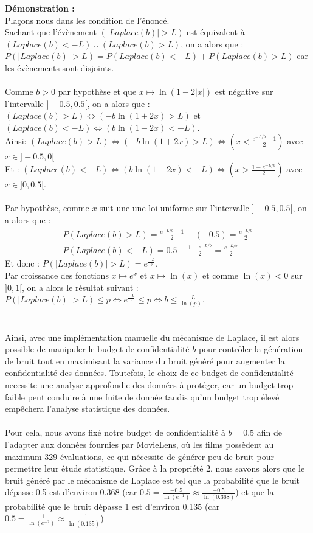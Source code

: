 \documentclass{article}
\begin{document}
\textbf{Démonstration :}\\
Plaçons nous dans les condition de l'énoncé.\\
Sachant que l'évènement $(|Laplace(b)| > L)$ est équivalent à $(Laplace(b)<-L) \cup (Laplace(b)>L)$, on a alors que :
\(P( |Laplace(b)| > L) = P(Laplace(b)<-L) + P(Laplace(b)>L) \) car les évènements sont disjoints.\\
\\
Comme $b>0$ par hypothèse et que $x\mapsto \ln(1 - 2|x|)$ est négative sur l'intervalle $]-0.5, 0.5[$, on a alors que :
\( (Laplace(b)>L) \Leftrightarrow (-b \ln(1+2x)>L)\) et \( (Laplace(b)<-L) \Leftrightarrow (b \ln(1-2x)<-L)\). \\
Ainsi: $ (Laplace(b)>L) \Leftrightarrow ( -b \ln(1+2x)>L) \Leftrightarrow (x < \frac{ e^{-L/b}-1}{2})$ avec $x\in]-0.5,0[$\\
Et : $ (Laplace(b)<-L) \Leftrightarrow ( b \ln(1-2x)<-L) \Leftrightarrow (x > \frac{ 1-e^{-L/b}}{2})$ avec $x\in]0,0.5[$.\\
\\
Par hypothèse, comme $x$ suit une une loi uniforme sur l'intervalle $]-0.5, 0.5[$, on a alors que :
\begin{align*}
    P(Laplace(b)>L) = \frac{ e^{-L/b}-1}{2} - (-0.5) = \frac{ e^{-L/b}}{2} \\
    P(Laplace(b)<-L) = 0.5 - \frac{ 1-e^{-L/b}}{2} = \frac{ e^{-L/b}}{2}
\end{align*}
Et donc : $P( |Laplace(b)| > L) = e^{\frac{-L}{b}}$.\\
Par croissance des fonctions $x\mapsto e^x$ et $x\mapsto \ln(x)$ et comme $\ln(x)<0$ sur $]0,1[$, on a alors le résultat suivant : $P( |Laplace(b)| > L) \leq p \Leftrightarrow e^{\frac{-L}{b}} \leq p \Leftrightarrow b \leq \frac{-L}{\ln(p)}$.\\
\\
\\
Ainsi, avec une implémentation manuelle du mécanisme de Laplace, il est alors possible de manipuler le budget de confidentialité $b$ pour contrôler
la génération de bruit tout en maximisant la variance du bruit généré pour augmenter la confidentialité des données. Toutefois, le choix de ce budget 
de confidentialité necessite une analyse approfondie des données à protéger, car un budget trop faible peut conduire à une fuite de donnée tandis qu'un 
budget trop élevé empêchera l'analyse statistique des données.\\
\\
Pour cela, nous avons fixé notre budget de confidentialité à $b=0.5$ afin de l’adapter aux données fournies par MovieLens, où les films possèdent au maximum 329 évaluations, 
ce qui nécessite de générer peu de bruit pour permettre leur étude statistique.
Grâce à la propriété 2, nous savons alors que le bruit généré par le mécanisme de Laplace est tel que la probabilité que le bruit dépasse 0.5 est 
d'environ 0.368 (car $0.5 = \frac{-0.5}{\ln(e^{-1})}\approx \frac{-0.5}{\ln(0.368)}$) et que la probabilité que le bruit dépasse 1 est d'environ 
0.135 (car $0.5 = \frac{-1}{\ln(e^{-2})}\approx \frac{-1}{\ln(0.135)}$) \\
\end{document}
